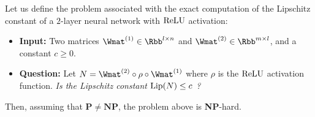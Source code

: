 \begin{theorem} \label{theorem:ch3-lipschitz_computation}
  Let us define the problem associated with the exact computation of the Lipschitz constant of a $2$-layer neural network with $\mathrm{ReLU}$ activation:
  \begin{itemize}%
    \item[] \textbf{Input:} Two matrices $\Wmat^{(1)} \in \Rbb^{l \times n}$ and $\Wmat^{(2)} \in \Rbb^{m \times l}$, and a constant $c \geq 0$.
    \item[] \textbf{Question:} Let $N = \Wmat^{(2)} \circ \rho \circ \Wmat^{(1)}$ where $\rho$ is the $\mathrm{ReLU}$ activation function. \emph{Is the Lipschitz constant $\lip{N} \leq c$ ?}
  \end{itemize}
  Then, assuming that $\mathbf{P} \neq \mathbf{NP}$, the problem above is \textbf{NP}-hard. 
\end{theorem}


